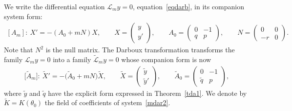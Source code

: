 \documentclass[pdftex]{sigma}%
\numberwithin{equation}{section}
\begin{document}
We write the differential equation ${\mathcal{L}}_my=0$, equation~\eqref{eqdarb}, in its companion system form:
\begin{gather}\label{mdar1}
[A_m]\colon\ X'=-(A_0+mN)X,\qquad\! X=\begin{pmatrix}y \\ y'\end{pmatrix}\!,\qquad\! A_0=\begin{pmatrix}0&-1 \\q&p\end{pmatrix}\!,\qquad\! N=\begin{pmatrix}0&0 \\ -r&0\end{pmatrix}\!.\!\!\!
\end{gather}
Note that $N^2$ is the null matrix.
The Darboux transformation transforms the family ${\mathcal{L}}_my=0$ into a family
$\widetilde{\mathcal L}_my=0$ whose companion form is now
\begin{gather}\label{mdar2}
\big[\widetilde A_m\big]\colon\ \widetilde{X}'=-\big(\widetilde A_0+mN\big) \widetilde{X}, \qquad
\widetilde{X} =\begin{pmatrix}\tilde{y} \\ \tilde{y}' \end{pmatrix}\!, \qquad \widetilde{A}_0=\begin{pmatrix}0&-1 \\\tilde{q}&p\end{pmatrix}\!,
\end{gather}
where $\tilde{y}$ and $\tilde{q}$ have the explicit form expressed in Theorem~\ref{tda1}. We denote by $\widetilde{K} = K(\theta_0)$ the field of coefficients of system~\eqref{mdar2}.
\end{document}
